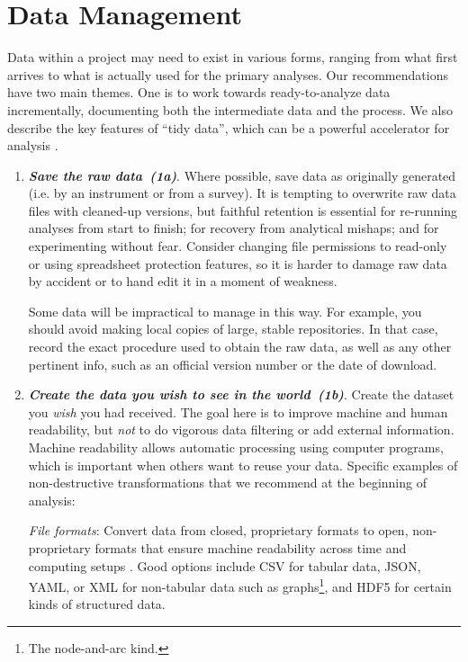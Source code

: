 \documentclass[10pt,letterpaper]{article}
\newcommand{\practicesection}[2]{\section{#1}\label{#2}}
\newcommand{\practice}[2]{\textbf{\emph{{#2}~({#1})}}}
\begin{document}
\practicesection{Data Management}{sec:data}

Data within a project may need to exist in various forms, ranging from
what first arrives to what is actually used for the primary analyses.
Our recommendations have two main themes. One is to work towards
ready-to-analyze data incrementally, documenting both the intermediate
data and the process. We also describe the key features of ``tidy
data'', which can be a powerful accelerator for analysis
\cite{wickham2014,hart2015}.

\begin{enumerate}

\item
  \practice{1a}{Save the raw data}.  Where possible,
  save data as originally generated (i.e. by an instrument or from a survey).
  It is
  tempting to overwrite raw data files with cleaned-up versions, but
  faithful retention is essential for re-running analyses
  from start to finish; for recovery from analytical
  mishaps; and for experimenting without fear. Consider changing file permissions to
  read-only or using spreadsheet protection features,
  so it is harder to damage raw
  data by accident or to hand edit it in a moment of weakness.

  Some data will be impractical to manage in this way. For example, you should avoid
  making local copies of large, stable repositories.
  In that case, record the exact procedure used to obtain the raw data, as well
  as any other pertinent info, such as an official version number or the date of download.

\item
  \practice{1b}{Create the data you wish to see in the world}. Create the dataset you
  \emph{wish} you had received.  The goal here is to improve machine and human
  readability, but \emph{not} to do vigorous data filtering or add external information.
  Machine readability allows automatic processing using computer programs,
  which is important when others want to reuse your data.
  Specific examples of non-destructive transformations that we recommend at the beginning
  of analysis:

  \emph{File formats}: Convert data from closed, proprietary formats to open,
  non-proprietary formats that ensure machine readability across time and computing
  setups \cite{ffIllinois}. Good options include CSV for tabular data, JSON, YAML, or XML for
  non-tabular data such as graphs\footnote{The node-and-arc kind.}, and HDF5 for certain
  kinds of structured data.


\end{enumerate}
\end{document}
